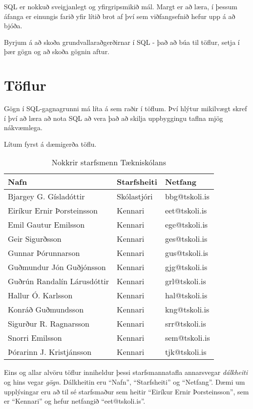 SQL er nokkuð sveigjanlegt og yfirgripsmikið mál. 
Margt er að læra, í þessum áfanga er einungis farið yfir lítið brot af því sem viðfangsefnið hefur upp á að bjóða.

Byrjum á að skoða grundvallaraðgerðirnar í SQL - það að búa til töflur, setja í þær gögn og að skoða gögnin aftur.
\section{Töflur}
Gögn í SQL-gagnagrunni má líta á sem raðir í töflum. Því hlýtur mikilvægt skref í því að læra að nota SQL að vera það að skilja uppbyggingu taflna mjög nákvæmlega.

Lítum fyrst á dæmigerða töflu.

\begin{table}
\centering
\caption{Nokkrir starfsmenn Tækniskólans}
\label{tafla:starfsmenn_ts}
\begin{tabular}{lll}
\toprule
Nafn&Starfsheiti&Netfang\\
\midrule
Bjargey G. Gísladóttir&Skólastjóri&bbg@tskoli.is\\
Eiríkur Ernir Þorsteinsson&Kennari&eet@tskoli.is\\
Emil Gautur Emilsson&Kennari&ege@tskoli.is\\
Geir Sigurðsson&Kennari&ges@tskoli.is\\
Gunnar Þórunnarson&Kennari&gus@tskoli.is\\
Guðmundur Jón Guðjónsson&Kennari&gjg@tskoli.is\\
Guðrún Randalín Lárusdóttir&Kennari&grl@tskoli.is\\
Hallur Ó. Karlsson&Kennari&hal@tskoli.is\\
Konráð Guðmundsson&Kennari&kng@tskoli.is\\
Sigurður R. Ragnarsson&Kennari&srr@tskoli.is\\
Snorri Emilsson&Kennari&sem@tskoli.is\\
Þórarinn J. Kristjánsson&Kennari&tjk@tskoli.is\\
\bottomrule
\end{tabular}
\end{table}
Eins og allar alvöru töflur inniheldur þessi starfsmannatafla annarsvegar \emph{dálkheiti} og hins vegar \emph{gögn}. Dálkheitin eru ``Nafn'', ``Starfsheiti'' og ``Netfang''. Dæmi um upplýsingar eru að til sé starfsmaður sem heitir ``Eiríkur Ernir Þorsteinsson'', sem er ``Kennari'' og hefur netfangið ``eet@tskoli.is''. 


